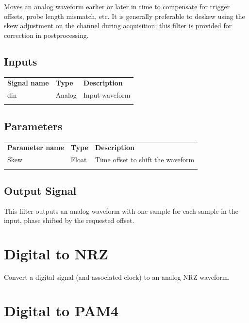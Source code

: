 Moves an analog waveform earlier or later in time to compensate for trigger offsets, probe length mismatch, etc.
It is generally preferable to deskew using the skew adjustment on the channel during acquisition; this filter is
provided for correction in postprocessing.

\subsection{Inputs}

\begin{tabularx}{16cm}{llX}
\thickhline
\textbf{Signal name} & \textbf{Type} & \textbf{Description} \\
\thickhline
din & Analog & Input waveform \\
\thickhline
\end{tabularx}

\subsection{Parameters}

\begin{tabularx}{16cm}{llX}
\thickhline
\textbf{Parameter name} & \textbf{Type} & \textbf{Description} \\
\thickhline
Skew & Float & Time offset to shift the waveform\\
\thickhline
\end{tabularx}

\subsection{Output Signal}

This filter outputs an analog waveform with one sample for each sample in the input, phase shifted by the requested
offset.

\pagebreak
\section{Digital to NRZ}

Convert a digital signal (and associated clock) to an analog NRZ waveform.

\pagebreak
\section{Digital to PAM4}

